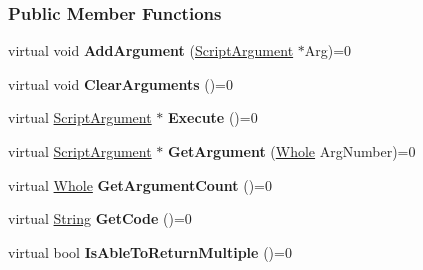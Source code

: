 \subsubsection*{Public Member Functions}
\begin{DoxyCompactItemize}
\item 
\hypertarget{classMezzanine_1_1Scripting_1_1Script_a0fa994729309867dff663c694218a33b}{
virtual void {\bfseries AddArgument} (\hyperlink{classMezzanine_1_1Scripting_1_1ScriptArgument}{ScriptArgument} $\ast$Arg)=0}
\label{classMezzanine_1_1Scripting_1_1Script_a0fa994729309867dff663c694218a33b}

\item 
\hypertarget{classMezzanine_1_1Scripting_1_1Script_a504d19bd50b8d9c5b23e85c5e3131a96}{
virtual void {\bfseries ClearArguments} ()=0}
\label{classMezzanine_1_1Scripting_1_1Script_a504d19bd50b8d9c5b23e85c5e3131a96}

\item 
\hypertarget{classMezzanine_1_1Scripting_1_1Script_a4f167dbb18b66c36e6ff486751a79691}{
virtual \hyperlink{classMezzanine_1_1Scripting_1_1ScriptArgument}{ScriptArgument} $\ast$ {\bfseries Execute} ()=0}
\label{classMezzanine_1_1Scripting_1_1Script_a4f167dbb18b66c36e6ff486751a79691}

\item 
\hypertarget{classMezzanine_1_1Scripting_1_1Script_a578dfa2467c196599b531f8d3f9787fd}{
virtual \hyperlink{classMezzanine_1_1Scripting_1_1ScriptArgument}{ScriptArgument} $\ast$ {\bfseries GetArgument} (\hyperlink{namespaceMezzanine_adcbb6ce6d1eb4379d109e51171e2e493}{Whole} ArgNumber)=0}
\label{classMezzanine_1_1Scripting_1_1Script_a578dfa2467c196599b531f8d3f9787fd}

\item 
\hypertarget{classMezzanine_1_1Scripting_1_1Script_a20f82daec225f6090ac118272a92c968}{
virtual \hyperlink{namespaceMezzanine_adcbb6ce6d1eb4379d109e51171e2e493}{Whole} {\bfseries GetArgumentCount} ()=0}
\label{classMezzanine_1_1Scripting_1_1Script_a20f82daec225f6090ac118272a92c968}

\item 
\hypertarget{classMezzanine_1_1Scripting_1_1Script_ae0f1bb7cd4f537b19fcd862c977ee8e3}{
virtual \hyperlink{namespaceMezzanine_acf9fcc130e6ebf08e3d8491aebcf1c86}{String} {\bfseries GetCode} ()=0}
\label{classMezzanine_1_1Scripting_1_1Script_ae0f1bb7cd4f537b19fcd862c977ee8e3}

\item 
\hypertarget{classMezzanine_1_1Scripting_1_1Script_af52caa05f853b4fe6daf4a8d49fc182a}{
virtual bool {\bfseries IsAbleToReturnMultiple} ()=0}
\label{classMezzanine_1_1Scripting_1_1Script_af52caa05f853b4fe6daf4a8d49fc182a}


\end{DoxyCompactItemize}
